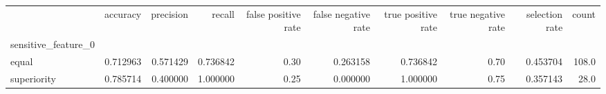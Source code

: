 \begin{tabular}{lrrrrrrrrr}
\toprule
{} &  accuracy &  precision &    recall &  false positive rate &  false negative rate &  true positive rate &  true negative rate &  selection rate &  count \\
sensitive\_feature\_0 &           &            &           &                      &                      &                     &                     &                 &        \\
\midrule
equal               &  0.712963 &   0.571429 &  0.736842 &                 0.30 &             0.263158 &            0.736842 &                0.70 &        0.453704 &  108.0 \\
superiority         &  0.785714 &   0.400000 &  1.000000 &                 0.25 &             0.000000 &            1.000000 &                0.75 &        0.357143 &   28.0 \\
\bottomrule
\end{tabular}
